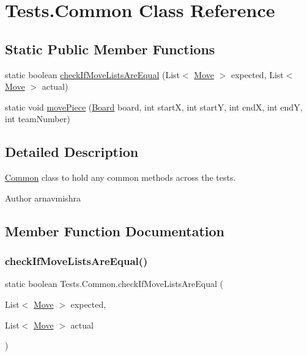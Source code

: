 \hypertarget{class_tests_1_1_common}{}\section{Tests.\+Common Class Reference}
\label{class_tests_1_1_common}
\subsection*{Static Public Member Functions}
\begin{DoxyCompactItemize}
\item 
static boolean \hyperlink{class_tests_1_1_common_a88d6dce17bfea9b706c866e0c896715d}{check\+If\+Move\+Lists\+Are\+Equal} (List$<$ \hyperlink{class_model_1_1_move}{Move} $>$ expected, List$<$ \hyperlink{class_model_1_1_move}{Move} $>$ actual)
\item 
static void \hyperlink{class_tests_1_1_common_a5809bd3c5d93653260370e00f74aad6a}{move\+Piece} (\hyperlink{class_model_1_1_board}{Board} board, int startX, int startY, int endX, int endY, int team\+Number)
\end{DoxyCompactItemize}


\subsection{Detailed Description}
\hyperlink{class_tests_1_1_common}{Common} class to hold any common methods across the tests. \begin{DoxyAuthor}{Author}
arnavmishra 
\end{DoxyAuthor}


\subsection{Member Function Documentation}
\hypertarget{class_tests_1_1_common_a88d6dce17bfea9b706c866e0c896715d}{}\label{class_tests_1_1_common_a88d6dce17bfea9b706c866e0c896715d} 
\subsubsection{\texorpdfstring{check\+If\+Move\+Lists\+Are\+Equal()}{checkIfMoveListsAreEqual()}}
{\footnotesize\ttfamily static boolean Tests.\+Common.\+check\+If\+Move\+Lists\+Are\+Equal (\begin{DoxyParamCaption}\item[{List$<$ \hyperlink{class_model_1_1_move}{Move} $>$}]{expected,  }\item[{List$<$ \hyperlink{class_model_1_1_move}{Move} $>$}]{actual }\end{DoxyParamCaption})\hspace{0.3cm}{\ttfamily [static]}}

